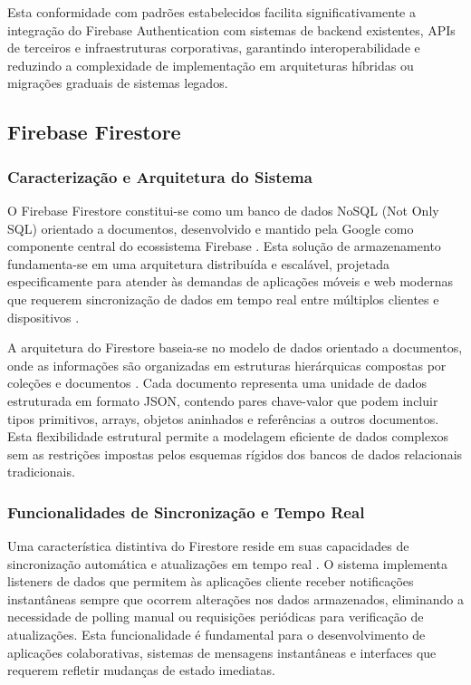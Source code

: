 Esta conformidade com padrões estabelecidos facilita significativamente a integração do Firebase Authentication com sistemas de backend existentes, APIs de terceiros e infraestruturas corporativas, garantindo interoperabilidade e reduzindo a complexidade de implementação em arquiteturas híbridas ou migrações graduais de sistemas legados.


\subsection{Firebase Firestore}
\subsubsection{Caracterização e Arquitetura do Sistema}

O Firebase Firestore constitui-se como um banco de dados NoSQL (Not Only SQL) orientado a documentos, desenvolvido e mantido pela Google como componente central do ecossistema Firebase \cite{google2023firestore}. Esta solução de armazenamento fundamenta-se em uma arquitetura distribuída e escalável, projetada especificamente para atender às demandas de aplicações móveis e web modernas que requerem sincronização de dados em tempo real entre múltiplos clientes e dispositivos \cite{chang2008bigtable}.

A arquitetura do Firestore baseia-se no modelo de dados orientado a documentos, onde as informações são organizadas em estruturas hierárquicas compostas por coleções e documentos \cite{mongodb2023nosql}. Cada documento representa uma unidade de dados estruturada em formato JSON, contendo pares chave-valor que podem incluir tipos primitivos, arrays, objetos aninhados e referências a outros documentos. Esta flexibilidade estrutural permite a modelagem eficiente de dados complexos sem as restrições impostas pelos esquemas rígidos dos bancos de dados relacionais tradicionais.

\subsubsection{Funcionalidades de Sincronização e Tempo Real}

Uma característica distintiva do Firestore reside em suas capacidades de sincronização automática e atualizações em tempo real \cite{firebase2023realtime}. O sistema implementa listeners de dados que permitem às aplicações cliente receber notificações instantâneas sempre que ocorrem alterações nos dados armazenados, eliminando a necessidade de polling manual ou requisições periódicas para verificação de atualizações. Esta funcionalidade é fundamental para o desenvolvimento de aplicações colaborativas, sistemas de mensagens instantâneas e interfaces que requerem refletir mudanças de estado imediatas.

